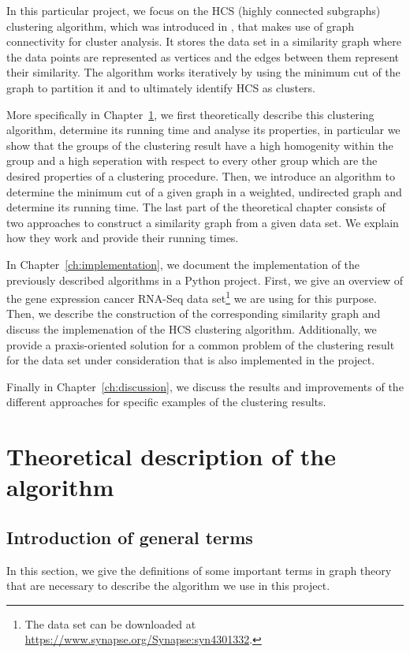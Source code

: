 \documentclass[paper=a4,fontsize=11pt,DIV=8,BCOR=5mm,twoside,pdftex,bibtotocnumbered]{scrreprt}
\theoremstyle{plain}
\begin{document}
In this particular project, we focus on the HCS (highly connected subgraphs) clustering algorithm, which was introduced in \cite{Hartuv2000}, that makes use of graph connectivity for cluster analysis. It stores the data set in a similarity graph where the data points are represented as vertices and the edges between them represent their similarity. The algorithm works iteratively by using the minimum cut of the graph to partition it and to ultimately identify HCS as clusters. 

More specifically in Chapter~\ref{ch:theory}, we first theoretically describe this clustering algorithm, determine its running time and analyse its properties, in particular we show that the groups of the clustering result have a high homogenity within the group and a high seperation with respect to every other group which are the desired properties of a clustering procedure. Then, we introduce an algorithm to determine the minimum cut of a given graph in a weighted, undirected graph and determine its running time. The last part of the theoretical chapter consists of two approaches to construct a similarity graph from a given data set. We explain how they work and provide their running times.

In Chapter~\ref{ch:implementation}, we document the implementation of the previously described algorithms in a Python project. First, we give an overview of the gene expression cancer RNA-Seq data set\footnote{The data set can be downloaded at \url{https://www.synapse.org/Synapse:syn4301332}.} we are using for this purpose. Then, we describe the construction of the corresponding similarity graph and discuss the implemenation of the HCS clustering algorithm. Additionally, we provide a praxis-oriented solution for a common problem of the clustering result for the data set under consideration that is also implemented in the project.

Finally in Chapter~\ref{ch:discussion}, we discuss the results and improvements of the different approaches for specific examples of the clustering results.

\chapter{Theoretical description of the algorithm}\label{ch:theory}

\section{Introduction of general terms}\label{sec:intro_def}
In this section, we give the definitions of some important terms in graph theory that are necessary to describe the algorithm we use in this project.
\end{document}
